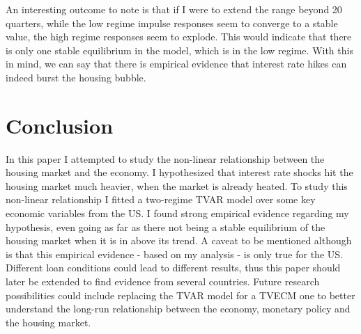 \documentclass[12pt,a4paper]{article}
\begin{document}
\noindent An interesting outcome to note is that if I were to extend the range beyond 20 quarters, while the low regime impulse responses seem to converge to a stable value, the high regime responses seem to explode. This would indicate that there is only one stable equilibrium in the model, which is in the low regime. With this in mind, we can say that there is empirical evidence that interest rate hikes can indeed burst the housing bubble.\\


\section{Conclusion}
In this paper I attempted to study the non-linear relationship between the housing market and the economy. I hypothesized that interest rate shocks hit the housing market much heavier, when the market is already heated. To study this non-linear relationship I fitted a two-regime TVAR model over some key economic variables from the US. I found strong empirical evidence regarding my hypothesis, even going as far as there not being a stable equilibrium of the housing market when it is in above its trend. A caveat to be mentioned although is that this empirical evidence - based on my analysis - is only true for the US. Different loan conditions could lead to different results, thus this paper should later be extended to find evidence from several countries. Future research possibilities could include replacing the TVAR model for a TVECM one to better understand the long-run relationship between the economy, monetary policy and the housing market.
 
\printbibliography[title = References]
\end{document}

